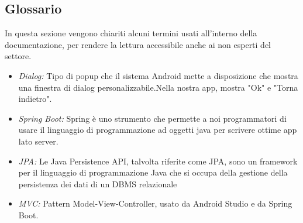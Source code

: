\subsection{Glossario}
    \begin{flushleft}
        In questa sezione vengono chiariti alcuni termini usati all'interno della documentazione, per rendere la lettura accessibile
        anche ai non esperti del settore.
    \end{flushleft}

    \begin{itemize}
        \item \emph{Dialog:} Tipo di popup che il sistema Android mette a disposizione che mostra una finestra di dialog personalizzabile.Nella nostra app, mostra "Ok" e "Torna indietro".
        \item \emph{Spring Boot:} Spring è uno strumento che permette a noi programmatori di usare il linguaggio di programmazione ad oggetti java per scrivere ottime app lato server.
        \item \emph{JPA:} Le Java Persistence API, talvolta riferite come JPA, sono un framework per il linguaggio di programmazione Java che si occupa della gestione della persistenza dei dati di un DBMS relazionale
        \item \emph{MVC:} Pattern Model-View-Controller, usato da Android Studio e da Spring Boot.
    \end{itemize}